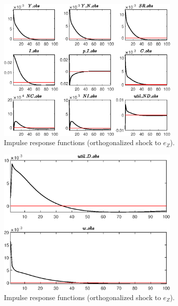 \begin{figure}[H]
\centering 
\includegraphics[width=0.80\textwidth]{RBC_sectoral/graphs/RBC_sectoral_IRF_e_Z1}
\caption{Impulse response functions (orthogonalized shock to ${e_Z}$).}\label{Fig:IRF:e_Z:1}
\end{figure}
 
\begin{figure}[H]
\centering 
\includegraphics[width=0.80\textwidth]{RBC_sectoral/graphs/RBC_sectoral_IRF_e_Z2}
\caption{Impulse response functions (orthogonalized shock to ${e_Z}$).}\label{Fig:IRF:e_Z:2}
\end{figure}
 

